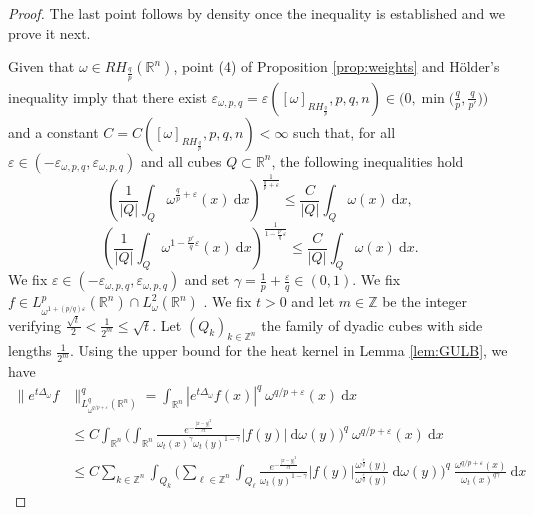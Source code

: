 \documentclass[12pt, letterpaper]{amsart}
\theoremstyle{definition}
\theoremstyle{remark}
\numberwithin{equation}{section}
\begin{document}
\begin{proof} The last point follows by density once the inequality is established and we prove it next. 

    Given that $\omega \in RH_{\frac{q}{p}}(\mathbb{R}^n)$, point (4) of Proposition \ref{prop:weights} and Hölder's inequality imply that there exist {$\varepsilon_{\omega, p,q} = \varepsilon([\omega]_{RH_{\frac{q}{p}}},p,q,n) \in \big(0, \min\big(\frac q p, \frac{q}{p'}\big)\big)$} and a constant $C = C([\omega]_{RH_{\frac{q}{p}}},p,q,n) <\infty$ such that, for all $\varepsilon \in (-\varepsilon_{\omega, p,q}, \varepsilon_{\omega, p,q})$ and all cubes $Q \subset \mathbb{R}^n$, the following inequalities hold
    \begin{equation}\label{eq:theta}
        \left ( \frac{1}{|Q|} \int_Q \omega^{\frac{q}{p}+\varepsilon}(x) \ \mathrm{d}x   \right )^{\frac{1}{\frac{q}{p}+\varepsilon}} \leq \frac{C}{|Q|} \int_Q \omega(x) \ \mathrm{d}x,
    \end{equation} 
    \begin{equation}\label{eq:thetatilde}
        \left ( \frac{1}{|Q|} \int_Q \omega^{1-\frac{p'}{q}\varepsilon}(x) \ \mathrm{d}x   \right )^{\frac{1}{1-\frac{p'}{q}\varepsilon} }\leq  \frac{C}{|Q|} \int_Q \omega(x) \ \mathrm{d}x.
    \end{equation}
    We fix $\varepsilon \in (-\varepsilon_{\omega, p,q},\varepsilon_{\omega, p,q})$ and set $\gamma= \frac{1}{p}+\frac{\varepsilon}{q} \in (0,1)$. We fix $f\in L^p_{\omega^{1+(p/q)\varepsilon}}(\mathbb{R}^n) \cap L^2_\omega(\mathbb{R}^n)$ . We fix $t>0$ and let $m \in \mathbb{Z}$ be the integer verifying $\frac{\sqrt{t}}{2}<\frac{1}{2^m}\le \sqrt{t}$. Let $(Q_{k})_{k\in \mathbb{Z}^n}$ the family of dyadic cubes with side lengths $\frac{1}{2^m}$. Using the upper bound for the heat kernel in Lemma \ref{lem:GULB}, we have  
    \begin{align*}
        \| e^{t\Delta_\omega} f &\|^q_{L^q_{{\omega}^{q/p+\varepsilon}}(\mathbb{R}^n)}= \int_{\mathbb{R}^n} |e^{t\Delta_\omega} f(x)|^q\  \omega^{q/p+\varepsilon}(x) \ \mathrm{d}x 
        \\&\leq C \int_{\mathbb{R}^n} \bigg( \int_{\mathbb{R}^n} \frac{e^{-\frac{|x-y|^2}{ct}}}{\omega_t(x)^{\gamma}\omega_t(y)^{1-\gamma}}|f(y)| \ \mathrm{d} \omega(y) \bigg)^q\  \omega^{q/p+\varepsilon}(x) \ \mathrm{d}x 
        \\& \leq C \sum_{k\in \mathbb{Z}^n} \int_{Q_{k}} \bigg( \sum_{\ell \in \mathbb{Z}^n} \int_{Q_{\ell}} \frac{e^{-\frac{|x-y|^2}{ct}}}{\omega_t(y)^{1-\gamma}}|f(y)| \frac{\omega^{\frac{\varepsilon}{q}}(y)}{\omega^{\frac{\varepsilon}{q}}(y)} \ \mathrm{d} \omega(y) \bigg)^q\ \frac{\omega^{q/p+\varepsilon}(x)}{\omega_t(x)^{q\gamma}} \ \mathrm{d}x

\end{align*}
\end{proof}
\end{document}
